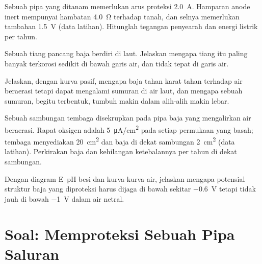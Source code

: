 \begin{exercise}[$\star\star$]\label{exo:b2:corrosion:8}
Sebuah pipa yang ditanam memerlukan arus proteksi \qty{2.0}{A}. Hamparan
anode inert mempunyai hambatan \qty{4.0}{\ohm} terhadap tanah, dan selnya
memerlukan tambahan \qty{1.5}{V} (data latihan). Hitunglah tegangan
penyearah dan energi listrik per tahun.
\end{exercise}

\begin{exercise}[$\star\star$]\label{exo:b2:corrosion:9}
Sebuah tiang pancang baja berdiri di laut. Jelaskan mengapa tiang itu
paling banyak terkorosi sedikit di bawah garis air, dan tidak tepat di
garis air.
\end{exercise}

\begin{exercise}[$\star\star\star$]\label{exo:b2:corrosion:10}
Jelaskan, dengan kurva pasif, mengapa baja tahan karat tahan terhadap air
beraerasi tetapi dapat mengalami sumuran di air laut, dan mengapa sebuah
sumuran, begitu terbentuk, tumbuh makin dalam alih-alih makin lebar.
\end{exercise}

\begin{exercise}[$\star\star\star$]\label{exo:b2:corrosion:11}
Sebuah sambungan tembaga disekrupkan pada pipa baja yang mengalirkan air
beraerasi. Rapat  oksigen adalah \qty{5}{\micro A/cm^2} pada
setiap permukaan yang basah; tembaga menyediakan \qty{20}{cm^2} dan baja di
dekat sambungan \qty{2}{cm^2} (data latihan). Perkirakan  baja
dan kehilangan ketebalannya per tahun di dekat sambungan.
\end{exercise}

\begin{exercise}[$\star\star\star$]\label{exo:b2:corrosion:12}
Dengan diagram E--pH besi dan kurva-kurva air, jelaskan mengapa potensial
struktur baja yang diproteksi harus dijaga di bawah sekitar \qty{-0.6}{V}
tetapi tidak jauh di bawah \qty{-1}{V} dalam air netral.
\end{exercise}

\section{Soal: Memproteksi Sebuah Pipa Saluran}

